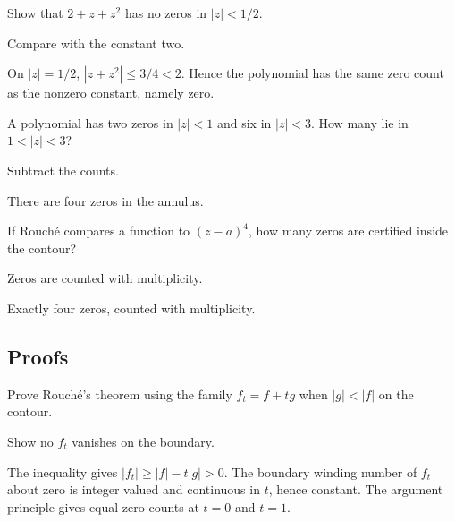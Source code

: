 \begin{exercise}\label{exr:iv13-expand-03}
Show that \(2+z+z^2\) has no zeros in \(|z|<1/2\).
\end{exercise}
\begin{hint}
Compare with the constant two.
\end{hint}
\begin{solution}
On \(|z|=1/2\), \(|z+z^2|\le3/4<2\). Hence the polynomial has the same zero count as the nonzero constant, namely zero.
\end{solution}

\begin{exercise}\label{exr:iv13-expand-04}
A polynomial has two zeros in \(|z|<1\) and six in \(|z|<3\). How many lie in \(1<|z|<3\)?
\end{exercise}
\begin{hint}
Subtract the counts.
\end{hint}
\begin{solution}
There are four zeros in the annulus.
\end{solution}

\begin{exercise}[Multiplicity]\label{exr:iv13-expand-05}
If Rouché compares a function to \((z-a)^4\), how many zeros are certified inside the contour?
\end{exercise}
\begin{hint}
Zeros are counted with multiplicity.
\end{hint}
\begin{solution}
Exactly four zeros, counted with multiplicity.
\end{solution}

\subsection*{Proofs}

\begin{exercise}\label{exr:iv13-expand-06}
Prove Rouché's theorem using the family \(f_t=f+t g\) when \(|g|<|f|\) on the contour.
\end{exercise}
\begin{hint}
Show no \(f_t\) vanishes on the boundary.
\end{hint}
\begin{solution}
The inequality gives \(|f_t|\ge|f|-t|g|>0\). The boundary winding number of \(f_t\) about zero is integer valued and continuous in \(t\), hence constant. The argument principle gives equal zero counts at \(t=0\) and \(t=1\).
\end{solution}

